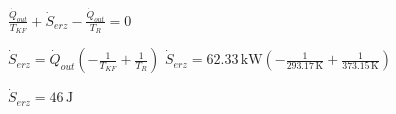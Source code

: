 \( \frac{\dot{Q}_{out}}{T_{KF}} + \dot{S}_{erz} - \frac{\dot{Q}_{out}}{T_R} = 0 \)  

\( \dot{S}_{erz} = \dot{Q}_{out} \left( -\frac{1}{T_{KF}} + \frac{1}{T_R} \right) \)  
\( \dot{S}_{erz} = 62.33 \, \text{kW} \left( -\frac{1}{293.17 \, \text{K}} + \frac{1}{373.15 \, \text{K}} \right) \)  

\( \dot{S}_{erz} = 46 \, \text{J} \)